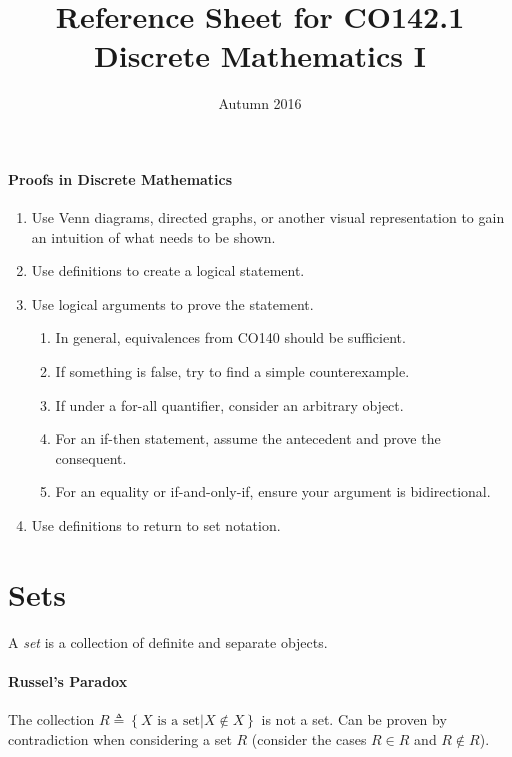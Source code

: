 \documentclass[10pt,twoside,twocolumn]{article}
\begin{document}
\title{Reference Sheet for CO142.1 Discrete Mathematics I}


\date{Autumn 2016}

\maketitle

\paragraph{Proofs in Discrete Mathematics}
\begin{enumerate}
\item Use Venn diagrams, directed graphs, or another visual representation
to gain an intuition of what needs to be shown.
\item Use definitions to create a logical statement.
\item Use logical arguments to prove the statement.

\begin{enumerate}
\item In general, equivalences from CO140 should be sufficient.
\item If something is false, try to find a simple counterexample.
\item If under a for-all quantifier, consider an arbitrary object.
\item For an if-then statement, assume the antecedent and prove the consequent.
\item For an equality or if-and-only-if, ensure your argument is bidirectional.
\end{enumerate}
\item Use definitions to return to set notation.
\end{enumerate}

\section{Sets}

A \emph{set} is a collection of definite and separate objects.


\paragraph{Russel's Paradox}

The collection $R\triangleq\left\{ X\mbox{ is a set}|X\notin X\right\} $
is not a set. Can be proven by contradiction when considering a set
$R$ (consider the cases $R\in R$ and $R\notin R$).
\end{document}
